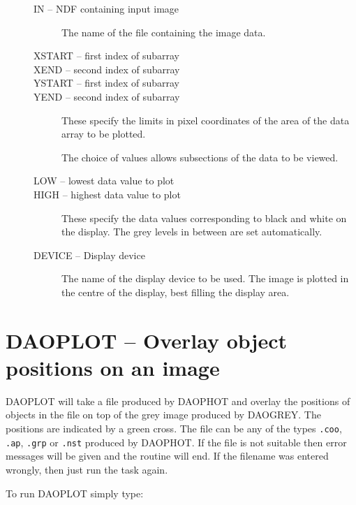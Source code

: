 \documentclass[11pt,nolof]{starlink}
\begin{document}
\begin{description}
\item[\mbox{}]\mbox{}
\begin{description}
\item[IN -- NDF containing input image]
The name of the file containing the image data.
\item[XSTART -- first index of subarray]
\item[XEND  -- second index of subarray]
\item[YSTART -- first index of subarray]
\item[YEND  -- second index of subarray]

These specify the limits in pixel coordinates of the area of the data array to
be plotted.

The choice of values allows subsections of the data to be viewed.

\item[LOW -- lowest data value to plot]
\item[HIGH -- highest data value to plot]

These specify the data values corresponding to black and white on the display.
The grey levels in between are set automatically.

\item[DEVICE -- Display device]

The name of the display device to be used.
The image is plotted in the centre of the display, best filling the display
area.

\end{description}
\end{description}

\section{DAOPLOT -- Overlay object positions on an image}
\label{sec:daoplot}

DAOPLOT will take a file produced by DAOPHOT and overlay the positions of objects
in the file on top of the grey image produced by DAOGREY. The positions are
indicated by a green cross. The file can be any of the types \texttt{.coo}, \texttt{.ap},
\texttt{.grp} or \texttt{.nst} produced by DAOPHOT. If the file is not suitable then
error messages will be given and the routine will end. If the filename was entered
wrongly, then just run the task again.

To run DAOPLOT simply type:

\begin{terminalv}
\end{terminalv}
\end{document}
